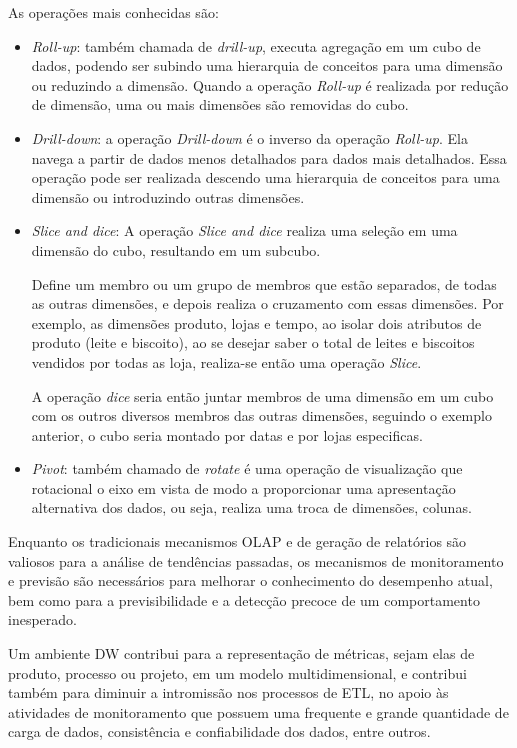 As operações mais conhecidas são:
\begin{itemize}
	\item \textit{Roll-up}: também chamada de \textit{drill-up}, executa agregação em um cubo de dados, podendo ser subindo uma hierarquia de conceitos para uma dimensão ou reduzindo a dimensão. Quando a operação \textit{Roll-up} é realizada por redução de dimensão, uma ou mais dimensões são removidas do cubo. \cite{han}
	\item \textit{Drill-down}: a operação \textit{Drill-down} é o inverso da operação \textit{Roll-up}. Ela navega a partir de dados menos detalhados para dados mais detalhados. Essa operação pode ser realizada descendo uma hierarquia de conceitos para uma dimensão ou introduzindo outras dimensões. \cite{han}
	\item \textit{Slice and dice}: A operação \textit{Slice and dice} realiza uma seleção em uma dimensão do cubo, resultando em um subcubo. \cite{han}
	
		Define um membro ou um grupo de membros que estão separados, de todas as outras dimensões, e depois realiza o cruzamento com essas dimensões. Por exemplo, as dimensões produto, lojas e tempo, ao isolar dois atributos de produto (leite e biscoito), ao se desejar saber o total de leites e biscoitos vendidos por todas as loja, realiza-se então uma operação \textit{Slice}.
		
		A operação \textit{dice} seria então juntar membros de uma dimensão em um cubo com os outros diversos membros das outras dimensões, seguindo o exemplo anterior, o cubo seria montado por datas e por lojas especificas.
	\item \textit{Pivot}: também chamado de \textit{rotate} é uma operação de visualização que rotacional o eixo em vista de modo a proporcionar uma apresentação alternativa dos dados, ou seja, realiza uma troca de dimensões, colunas. \cite{han}\cite{redbooks}
\end{itemize}

Enquanto os tradicionais mecanismos OLAP e de geração de relatórios são valiosos para a análise de tendências passadas, os mecanismos de monitoramento e previsão são necessários para melhorar o conhecimento do desempenho atual, bem como para a previsibilidade e a detecção precoce de um comportamento inesperado. \cite{spdw}

Um ambiente DW contribui para a representação de métricas, sejam elas de produto, processo ou projeto, em um modelo multidimensional, e contribui também para diminuir a intromissão nos processos de ETL, no apoio às atividades de monitoramento que possuem uma frequente e grande quantidade de carga de dados, consistência e confiabilidade dos dados, entre outros. \cite{spdw}

